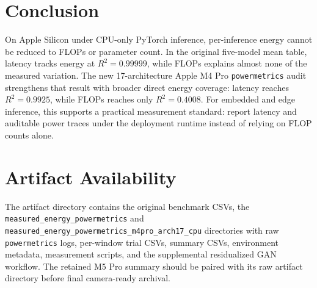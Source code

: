 \documentclass[conference]{IEEEtran}
\begin{document}
\section{Conclusion}

On Apple Silicon under CPU-only PyTorch inference, per-inference energy cannot
be reduced to FLOPs or parameter count. In the original five-model mean table,
latency tracks energy at $R^2=0.99999$, while FLOPs explains almost none of
the measured variation. The new 17-architecture Apple M4 Pro
\texttt{powermetrics} audit strengthens that result with broader direct energy
coverage: latency reaches $R^2=0.9925$, while FLOPs reaches only
$R^2=0.4008$. For embedded and edge inference, this supports a practical
measurement standard: report latency and auditable power traces under the
deployment runtime instead of relying on FLOP counts alone.

\section*{Artifact Availability}

The artifact directory contains the original benchmark CSVs, the
\texttt{measured\_energy\_powermetrics} and
\texttt{measured\_energy\_powermetrics\_m4pro\_arch17\_cpu} directories with raw
\texttt{powermetrics} logs, per-window trial CSVs, summary CSVs, environment
metadata, measurement scripts, and the supplemental residualized GAN workflow.
The retained M5 Pro summary should be paired with its raw artifact directory
before final camera-ready archival.
\end{document}
